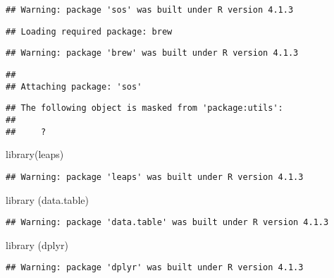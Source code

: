 \documentclass[
]{article}
\newenvironment{Shaded}{\begin{snugshade}}{\end{snugshade}}
\newcommand{\FunctionTok}[1]{\textcolor[rgb]{0.00,0.00,0.00}{#1}}
\newcommand{\NormalTok}[1]{#1}
\begin{document}
\begin{verbatim}
## Warning: package 'sos' was built under R version 4.1.3
\end{verbatim}

\begin{verbatim}
## Loading required package: brew
\end{verbatim}

\begin{verbatim}
## Warning: package 'brew' was built under R version 4.1.3
\end{verbatim}

\begin{verbatim}
## 
## Attaching package: 'sos'
\end{verbatim}

\begin{verbatim}
## The following object is masked from 'package:utils':
## 
##     ?
\end{verbatim}

\begin{Shaded}
\begin{Highlighting}[]
\FunctionTok{library}\NormalTok{(leaps)}
\end{Highlighting}
\end{Shaded}

\begin{verbatim}
## Warning: package 'leaps' was built under R version 4.1.3
\end{verbatim}

\begin{Shaded}
\begin{Highlighting}[]
\FunctionTok{library}\NormalTok{ (data.table)}
\end{Highlighting}
\end{Shaded}

\begin{verbatim}
## Warning: package 'data.table' was built under R version 4.1.3
\end{verbatim}

\begin{Shaded}
\begin{Highlighting}[]
\FunctionTok{library}\NormalTok{ (dplyr)}
\end{Highlighting}
\end{Shaded}

\begin{verbatim}
## Warning: package 'dplyr' was built under R version 4.1.3
\end{verbatim}
\end{document}

